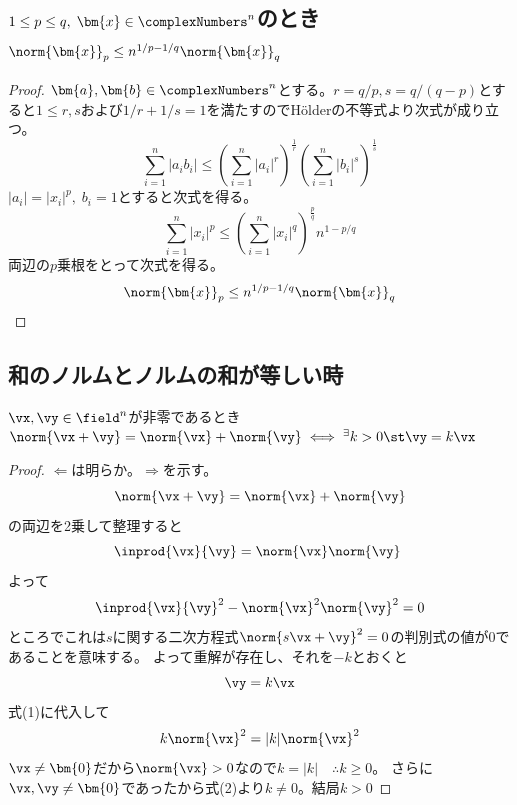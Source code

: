         \subsection{\texorpdfstring{$1\leq p\leq q,\;\bm{x}\in\complexNumbers^n$}{1≦p≦q, x∈C\string^n}のとき\texorpdfstring{$\norm{\bm{x}}_p \leq n^{1/p-1/q}\norm{\bm{x}}_q$}{||x||\_p ≦ n\string^(1/p-1/q)||x||\_q}}
            \begin{proof}
                \quad\par
                $\bm{a},\bm{b}\in\complexNumbers^n$とする。$r=q/p, s=q/(q-p)$とすると$1\leq r,s$および$1/r+1/s=1$を満たすのでH\"olderの不等式より次式が成り立つ。
                \[ \sum_{i=1}^n|a_ib_i| \leq \left(\sum_{i=1}^n|a_i|^r\right)^\frac{1}{r}\left(\sum_{i=1}^n|b_i|^s\right)^\frac{1}{s} \]
                $|a_i| = |x_i|^p,\;b_i=1$とすると次式を得る。
                \[ \sum_{i=1}^n|x_i|^p \leq \left(\sum_{i=1}^n|x_i|^q\right)^\frac{p}{q}n^{1-p/q} \]
                両辺の$p$乗根をとって次式を得る。
                \[ \norm{\bm{x}}_p \leq n^{1/p-1/q}\norm{\bm{x}}_q \]
            \end{proof}
        \subsection{和のノルムとノルムの和が等しい時}
            \begin{shadebox}
                $\vx,\vy\in\field^n$が非零であるとき$\norm{\vx+\vy}=\norm{\vx}+\norm{\vy} \iff ^\exists k>0 \st \vy=k\vx$
            \end{shadebox}
            \begin{proof}
                \quad\par
                $\Leftarrow$は明らか。$\Rightarrow$を示す。
                \[\norm{\vx+\vy}=\norm{\vx}+\norm{\vy}\]
                の両辺を2乗して整理すると
                \begin{equation}
                    \inprod{\vx}{\vy} = \norm{\vx}\norm{\vy}\
                \end{equation}
                よって
                \[\inprod{\vx}{\vy}^2-\norm{\vx}^2\norm{\vy}^2=0\]
                ところでこれは$s$に関する二次方程式$\norm{s\vx+\vy}^2=0$の判別式の値が$0$であることを意味する。
                よって重解が存在し、それを$-k$とおくと
                \begin{equation}
                    \vy = k\vx
                \end{equation}
                式(1)に代入して
                \[k\norm{\vx}^2 = |k|\norm{\vx}^2\]
                $\vx\neq\bm{0}$だから$\norm{\vx}>0$なので$k=|k|\quad\therefore k\geq0$。
                さらに$\vx,\vy\neq\bm{0}$であったから式(2)より$k\neq0$。結局$k>0$
            \end{proof}
